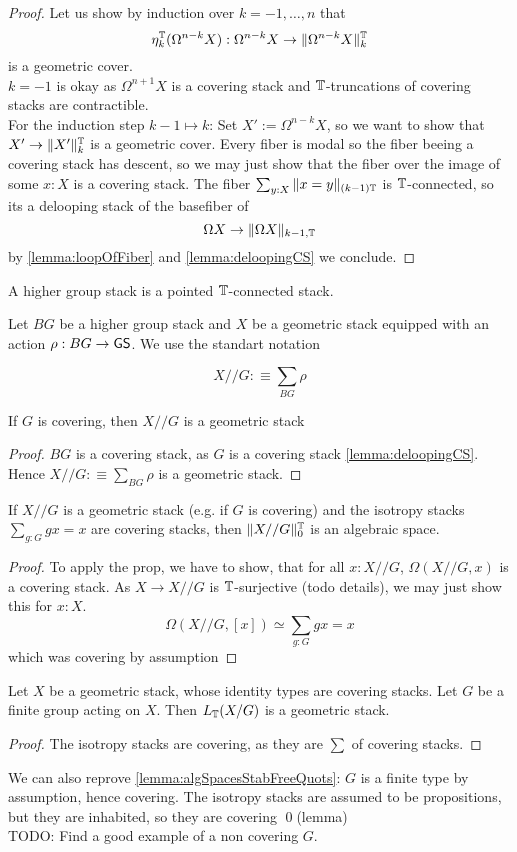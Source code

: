 \begin{proof}
	Let us show by induction over $k = -1,\hdots,n$ that 
	\[\eta_k^{\mathbb{T}} (\Omega^{n - k} X) : \Omega^{n - k} X \to \|\Omega^{n - k} X\|_k^{\mathbb{T}}\]
	is a geometric cover.  \\
	$k=-1$ is okay as $\Omega^{n+1} X$ is a covering stack and $\mathbb{T}$-truncations of covering stacks are contractible. \\
	For the induction step $k - 1 \mapsto k$:
	Set $X' := \Omega^{n-k} X$, so we want to show that $X' \to \|X'\|_k^{\mathbb{T}}$ is a geometric cover.
	Every fiber is modal so the fiber beeing a covering stack has descent, so we may just show that the fiber over the image of some $x : X$ is a covering stack. The fiber $\sum_{y : X} \| x = y\|_{(k-1)\mathbb{T}}$ is $\mathbb{T}$-connected, so its a delooping stack of the basefiber of 
	\[
	\Omega X  \to \|\Omega X \|_{k-1, \mathbb{T}}
	\]
	by \ref{lemma:loopOfFiber} and \ref{lemma:deloopingCS} we conclude.
\end{proof}


\begin{definition}
	A higher group stack is a pointed $\mathbb{T}$-connected stack.
\end{definition}
Let $BG$ be a higher group stack and $X$ be a geometric stack equipped with an action $\rho : BG \to \mathsf{GS}$. We use the standart notation

\[
X // G :\equiv \sum_{BG} \rho
\]
\begin{lemma}
	If $G$ is covering, then $X // G$ is a geometric stack
\end{lemma}
\begin{proof}
	$BG$ is a covering stack, as $G$ is a covering stack \ref{lemma:deloopingCS}. Hence $X // G :\equiv \sum_{BG} \rho$ is a geometric stack.
\end{proof}
\begin{prop}
	If $X // G$ is a geometric stack (e.g. if $G$ is covering) and the isotropy stacks $\sum_{g : G} g x = x$ are covering stacks, then $\| X // G \|_0^{\mathbb{T}}$ is an algebraic space.
\end{prop}
\begin{proof}
	To apply the prop, we have to show, that for all $x : X // G$, $\Omega (X // G,x)$ is a covering stack. As $X \to X // G$ is $\mathbb{T}$-surjective (todo details), we may just show this for $x : X$.
	\[
	\Omega (X // G , [x]) \simeq \sum_{g: G} g x = x
	\]
	which was covering by assumption
\end{proof}
\begin{corollary}
	Let $X$ be a geometric stack, whose identity types are covering stacks. Let $G$ be a finite group acting on $X$. Then $L_{\mathbb{T}} (X / G)$ is a geometric stack.
\end{corollary}
\begin{proof}
	The isotropy stacks are covering, as they are $\sum$ of covering stacks.
\end{proof}
We can also reprove \ref{lemma:algSpacesStabFreeQuots}: $G$ is a finite type by assumption, hence covering. The isotropy stacks are assumed to be propositions, but they are inhabited, so they are covering \qed(lemma) \\

TODO: Find a good example of a non covering $G$.